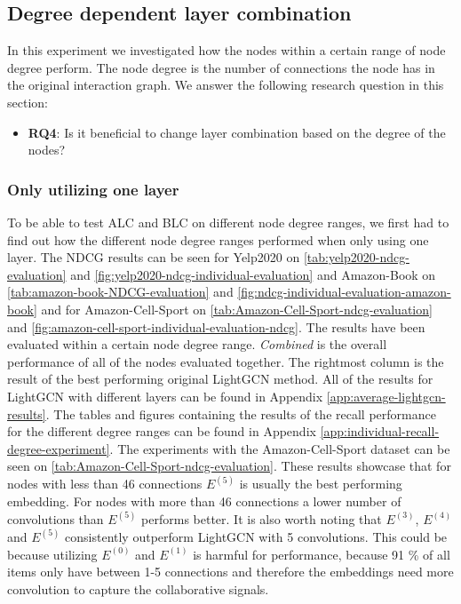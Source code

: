 \subsection{Degree dependent layer combination}\label{subsec:degree-experiment}
In this experiment we investigated how the nodes within a certain range of node degree perform.
The node degree is the number of connections the node has in the original interaction graph.
We answer the following research question in this section:
\begin{itemize}
    \item \textbf{RQ4}: Is it beneficial to change layer combination based on the degree of the nodes?
\end{itemize}

\subsubsection{Only utilizing one layer}
To be able to test ALC and BLC on different node degree ranges, we first had to find out how the different node degree ranges performed when only using one layer.
The NDCG results can be seen for Yelp2020 on \autoref{tab:yelp2020-ndcg-evaluation} and \autoref{fig:yelp2020-ndcg-individual-evaluation} and Amazon-Book on \autoref{tab:amazon-book-NDCG-evaluation} and \autoref{fig:ndcg-individual-evaluation-amazon-book} and for Amazon-Cell-Sport on \autoref{tab:Amazon-Cell-Sport-ndcg-evaluation} and \autoref{fig:amazon-cell-sport-individual-evaluation-ndcg}.
The results have been evaluated within a certain node degree range.
\textit{Combined} is the overall performance of all of the nodes evaluated together.
The rightmost column is the result of the best performing original LightGCN method.
All of the results for LightGCN with different layers can be found in Appendix \ref{app:average-lightgcn-results}.
The tables and figures containing the results of the recall performance for the different degree ranges can be found in Appendix \ref{app:individual-recall-degree-experiment}.
The experiments with the Amazon-Cell-Sport dataset can be seen on \autoref{tab:Amazon-Cell-Sport-ndcg-evaluation}.
These results showcase that for nodes with less than 46 connections $E^{(5)}$ is usually the best performing embedding.
For nodes with more than 46 connections a lower number of convolutions than $E^{(5)}$ performs better.
It is also worth noting that $E^{(3)}$, $E^{(4)}$ and $E^{(5)}$ consistently outperform LightGCN with 5 convolutions.
This could be because utilizing $E^{(0)}$ and $E^{(1)}$ is harmful for performance, because 91 \% of all items only have between 1-5 connections and therefore the embeddings need more convolution to capture the collaborative signals.
